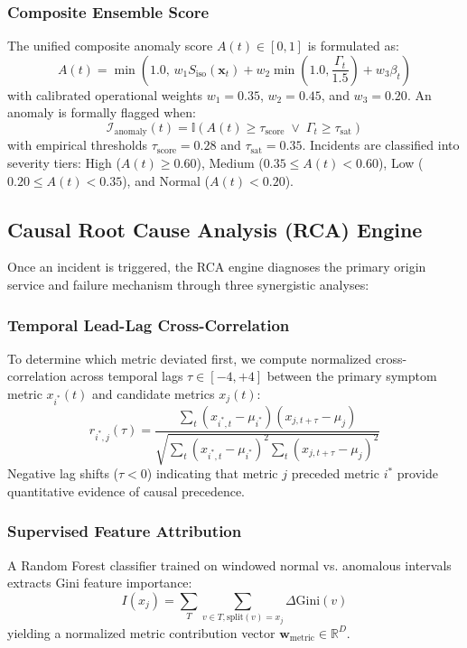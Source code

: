 \documentclass[conference]{IEEEtran}
\begin{document}
\subsubsection{Composite Ensemble Score}
The unified composite anomaly score $A(t) \in [0, 1]$ is formulated as:
\begin{equation}
A(t) = \min\left(1.0, \, w_1 S_{\text{iso}}(\mathbf{x}_t) + w_2 \min\left(1.0, \frac{\Gamma_t}{1.5}\right) + w_3 \beta_t\right)
\end{equation}
with calibrated operational weights $w_1 = 0.35$, $w_2 = 0.45$, and $w_3 = 0.20$. An anomaly is formally flagged when:
\begin{equation}
\mathcal{I}_{\text{anomaly}}(t) = \mathbb{I}\left(A(t) \ge \tau_{\text{score}} \;\lor\; \Gamma_t \ge \tau_{\text{sat}}\right)
\end{equation}
with empirical thresholds $\tau_{\text{score}} = 0.28$ and $\tau_{\text{sat}} = 0.35$. Incidents are classified into severity tiers: High ($A(t) \ge 0.60$), Medium ($0.35 \le A(t) < 0.60$), Low ($0.20 \le A(t) < 0.35$), and Normal ($A(t) < 0.20$).

\subsection{Causal Root Cause Analysis (RCA) Engine}
Once an incident is triggered, the RCA engine diagnoses the primary origin service and failure mechanism through three synergistic analyses:

\subsubsection{Temporal Lead-Lag Cross-Correlation}
To determine which metric deviated first, we compute normalized cross-correlation across temporal lags $\tau \in [-4, +4]$ between the primary symptom metric $x_{i^*}(t)$ and candidate metrics $x_j(t)$:
\begin{equation}
r_{i^*, j}(\tau) = \frac{\sum_{t} (x_{i^*, t} - \mu_{i^*})(x_{j, t+\tau} - \mu_j)}{\sqrt{\sum_{t} (x_{i^*, t} - \mu_{i^*})^2 \sum_{t} (x_{j, t+\tau} - \mu_j)^2}}
\end{equation}
Negative lag shifts ($\tau < 0$) indicating that metric $j$ preceded metric $i^*$ provide quantitative evidence of causal precedence.

\subsubsection{Supervised Feature Attribution}
A Random Forest classifier trained on windowed normal vs. anomalous intervals extracts Gini feature importance:
\begin{equation}
I(x_j) = \sum_{T} \sum_{v \in T, \text{split}(v)=x_j} \Delta \text{Gini}(v)
\end{equation}
yielding a normalized metric contribution vector $\mathbf{w}_{\text{metric}} \in \mathbb{R}^D$.
\end{document}
